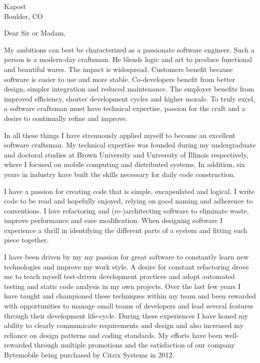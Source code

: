 \documentclass{letter}
\date{}
\begin{document}
\address{Nathanael Thompson\\1102 Lincolnshire Drive\\Champaign, IL 61821\\nat@alumni.brown.edu\\(469)
230-7125 (mobile)}
\signature{Nathanael Thompson}
\begin{letter}{Kapost\\Boulder, CO}

\opening{Dear Sir or Madam,}
My ambitions can best be characterized as a passionate software
engineer.  Such a person is a modern-day craftsman.  He blends logic
and art to produce functional and beautiful wares.  The impact is
widespread.  Customers benefit because software is easier to use
and more stable.  Co-developers benefit from better design, simpler
integration and reduced maintenance.  The employer benefits from
improved efficiency, shorter development cycles and higher morale.
To truly excel, a software craftsman must have technical expertise,
passion for the craft and a desire to continually refine and improve.

In all these things I have strenuously applied myself to become an
excellent software craftsman.  My technical expertise was founded
during my undergraduate and doctoral studies at Brown University
and University of Illinois respectively, where I focused on mobile
computing and distributed systems.  In addition, six years in
industry have built the skills necessary for daily code construction.

I have a passion for creating code that is simple, encapsulated and
logical.  I write code to be read and hopefully enjoyed, relying
on good naming and adherence to conventions.  I love refactoring
and (re-)architecting software to eliminate waste, improve performance
and ease modification.  When designing software I experience a
thrill in identifying the different parts of a system and fitting
each piece together.

I have been driven by my my passion for great software to constantly
learn new technologies and improve my work style.  A desire for
constant refactoring drove me to teach myself test-driven development
practices and adopt automated testing and static code analysis in
my own projects.  Over the last few years I have taught and championed
these techniques within my team and been rewarded with opportunities
to manage small teams of developers and lead several features through
their development life-cycle.  During these experiences I have honed
my ability to clearly communicate requirements and design and
also increased my reliance on design patterns and coding standards.
My efforts have been well-rewarded through multiple promotions and
the satisfaction of our company Bytemobile being purchased by Citrix
Systems in 2012.


\end{letter}
\end{document}
